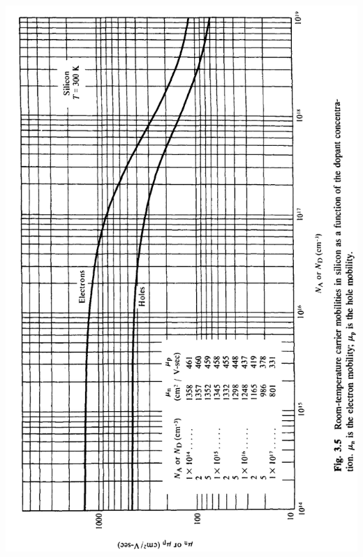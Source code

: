 \begin{multicols}{2}
          \medbreak\noindent\minipage{\columnwidth}
            \includegraphics[width=\columnwidth]{V1Figure3-5.png}
        \endminipage\medbreak
\end{multicols}
